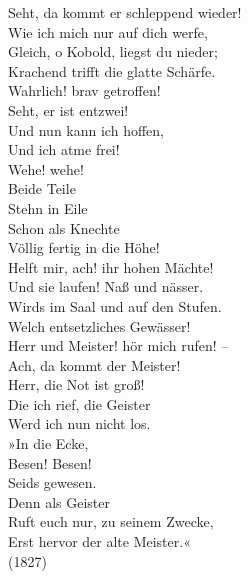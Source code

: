 {    Seht, da kommt er schleppend wieder! \\
    Wie ich mich nur auf dich werfe, \\
    Gleich, o Kobold, liegst du nieder; \\
    Krachend trifft die glatte Schärfe. \\
    Wahrlich! brav getroffen! \\
    Seht, er ist entzwei! \\
    Und nun kann ich hoffen, \\
    Und ich atme frei! \\

    Wehe! wehe! \\
    Beide Teile \\
    Stehn in Eile \\
    Schon als Knechte \\
    Völlig fertig in die Höhe! \\
    Helft mir, ach! ihr hohen Mächte! \\

    Und sie laufen! Naß und nässer. \\
    Wirds im Saal und auf den Stufen. \\
    Welch entsetzliches Gewässer! \\
    Herr und Meister! hör mich rufen! – \\
    Ach, da kommt der Meister! \\
    Herr, die Not ist groß! \\
    Die ich rief, die Geister \\
    Werd ich nun nicht los.\\

    »In die Ecke, \\
    Besen! Besen! \\
    Seids gewesen. \\
    Denn als Geister \\
    Ruft euch nur, zu seinem Zwecke, \\
    Erst hervor der alte Meister.« \\

    (1827) \\
}
{}
\clearpage
\artikelohnevorspann{}
